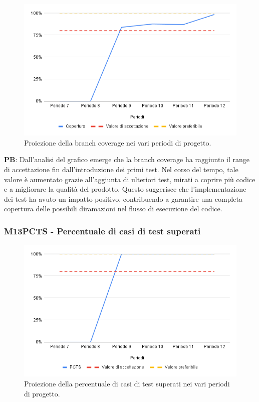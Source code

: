 \begin{figure}[H]
    \centering
    \includegraphics[width=1\textwidth]{../Images/PianoDiQualifica/M16BC.png}
    \caption{Proiezione della branch coverage nei vari periodi di progetto.}
    \label{fig:14}
\end{figure}

\vspace{0.2cm}

\textbf{PB}: Dall’analisi del grafico emerge che la branch coverage ha raggiunto il range di accettazione fin dall’introduzione dei primi test. Nel corso del tempo, tale valore è aumentato grazie all’aggiunta di ulteriori test, mirati a coprire più codice e a migliorare la qualità del prodotto. Questo suggerisce che l’implementazione dei test ha avuto un impatto positivo, contribuendo a garantire una completa copertura delle possibili diramazioni nel flusso di esecuzione del codice.

\vspace{0.2cm}

\subsubsection{M13PCTS - Percentuale di casi di test superati}

\vspace{0.3cm}

\begin{figure}[H]
    \centering
    \includegraphics[width=1\textwidth]{../Images/PianoDiQualifica/M13PCTS.png}
    \caption{Proiezione della percentuale di casi di test superati nei vari periodi di progetto.}
    \label{fig:15}
\end{figure}

